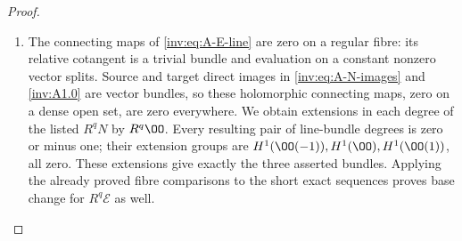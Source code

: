 \begin{proof}
\begin{enumerate}[label=\arabic*.,leftmargin=*]
\item The connecting maps of \eqref{inv:eq:A-E-line} are zero on a regular
fibre: its relative cotangent is a trivial bundle and evaluation on
a constant nonzero vector splits.  Source and target direct images
in \eqref{inv:eq:A-N-images} and \cref{inv:A1.0} are vector bundles,
so these holomorphic connecting maps, zero on a dense open set, are
zero everywhere.  We obtain extensions in each degree of the listed
$R^qN$ by $R^q\OO$.  Every resulting pair of line-bundle degrees is
zero or minus one; their extension groups are
$H^1(\OO(-1)),H^1(\OO),H^1(\OO(1))$, all zero.  These extensions
give exactly the three asserted bundles.  Applying the already proved
fibre comparisons to the short exact sequences proves base change
for $R^q\mathcal E$ as well.  
\end{enumerate}
\end{proof}
